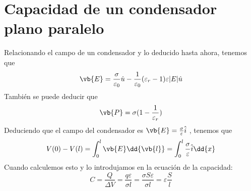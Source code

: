 \documentclass{./FisicaII.tex}
\begin{document}
\section{Capacidad de un condensador plano paralelo}
Relacionando el campo de un condensador y lo deducido hasta ahora, tenemos que
\[
	\vb{E} = \frac{\sigma }{\varepsilon _{0}} \hat{u} - \frac{1}{\varepsilon _{0}}
	(\varepsilon _{r}-1)\varepsilon |E| \hat{u}
\]
También se puede deducir que
\[
	\vb{P} = \sigma (1-\frac{1}{\varepsilon _{r}})
\]
Deduciendo que el campo del condensador es \(\vb{E} = \frac{\sigma }{\varepsilon } \hat{i}\)
, tenemos que
\[
	V(0) - V(l) = \int_{0}^l \vb{E} \dd{\vb{l}} = \int_{0}^{l} \frac{\sigma }{\varepsilon }\hat{i}  \dd{x}
\]
Cuando calculemos esto y lo introdujamos en la ecuación de la capacidad:
\[
	C = \frac{Q}{\Delta V} = \frac{q\varepsilon }{\sigma l}= \frac{\sigma S \varepsilon }{\sigma l}
	= \varepsilon \frac{S}{l}
\]
\end{document}
